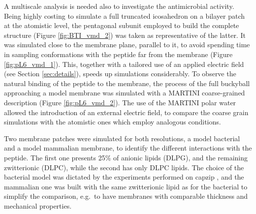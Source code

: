 A multiscale analysis is needed also to investigate the antimicrobial activity. Being highly costing to simulate a full truncated icosahedron on a bilayer patch at the atomistic level, the pentagonal subunit employed to build the complete structure (Figure \ref{fig:BTI_vmd_2}) was taken as representative of the latter. It was simulated close to the membrane plane, parallel to it, to avoid spending time in sampling conformations with the peptide far from the membrane (Figure \ref{fig:pL6_vmd_1}). This, together with a tailored use of an applied electric field (see Section \ref{sec:details}), speeds up simulations considerably.
%
To observe the natural binding of the peptide to the membrane, the process of the full buckyball approaching a model membrane was simulated with a MARTINI coarse-grained description (Figure \ref{fig:pL6_vmd_2}). The use of the MARTINI polar water \citep{Yesylevskyy2010} allowed the introduction of an external electric field, to compare the coarse grain simulations with the atomistic ones which employ analogous conditions.

Two membrane patches were simulated for both resolutions, a model bacterial and a model mammalian membrane, to identify the different interactions with the peptide. The first one presents 25\% of anionic lipids (DLPG), and the remaining zwitterionic (DLPC), while the second has only DLPC lipids. The choice of the bacterial model was dictated by the experiments performed on capzip \citep{Castelletto2016}, and the mammalian one was built with the same zwitterionic lipid as for the bacterial to simplify the comparison, e.g.\ to have membranes with comparable thickness and mechanical properties.

